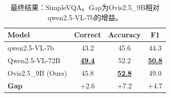 \begin{table}[htbp]
\centering
\small
\renewcommand{\arraystretch}{1.3}
\caption{最终结果：Chinese SimpleVQA。Gap为Ovis2.5\_9B相对qwen2.5-VL-7b的增益。}
\label{tab:wk_final_chinese}
\end{table}

\begin{table}[htbp]
\centering
\small
\renewcommand{\arraystretch}{1.3}
\begin{tabular}{lccc}
\toprule
\textbf{Model} & \textbf{Correct} & \textbf{Accuracy} & \textbf{F1} \\
\midrule
qwen2.5-VL-7b & 43.2 & 45.6 & 44.3 \\
Qwen2.5-VL-72B & \textbf{\underline{49.4}} & 52.2 & \textbf{\underline{50.8}} \\
Ovis2.5\_9B (Ours) & 45.8 & \textbf{\underline{52.8}} & 49.0 \\
\midrule
\textbf{Gap} & +2.6 & +7.2 & +4.7 \\
\bottomrule
\end{tabular}
\caption{最终结果：SimpleVQA。Gap为Ovis2.5\_9B相对qwen2.5-VL-7b的增益。}
\label{tab:wk_final_english}
\end{table}

